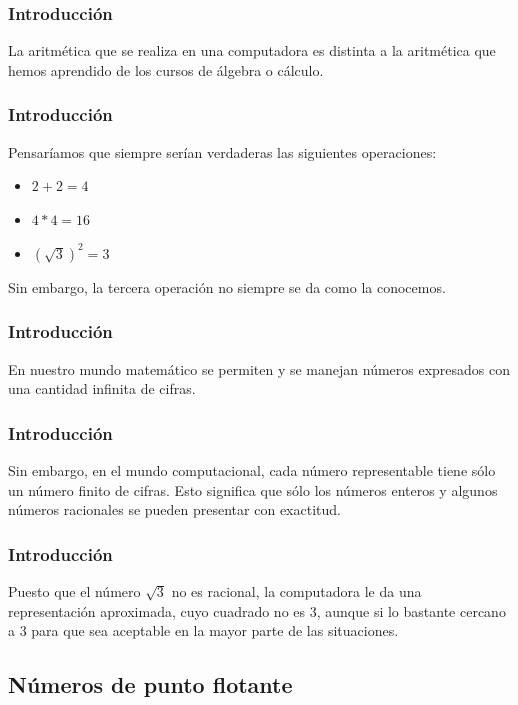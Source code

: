 \documentclass[12pt]{beamer}
\begin{document}
\begin{frame}
\frametitle{Introducción}
La aritmética que se realiza en una computadora es distinta a la aritmética que hemos aprendido de los cursos de álgebra o cálculo.
\end{frame}
\begin{frame}
\frametitle{Introducción}
Pensaríamos que siempre serían verdaderas las siguientes operaciones:
\pause
\begin{itemize}
\item[\ding{213}] $2 + 2 = 4$
\item[\ding{213}] $4 * 4 = 16$
\item[\ding{213}] $(\sqrt{3})^{2} = 3$
\end{itemize}
Sin embargo, la tercera  operación no siempre se da como la conocemos.
\end{frame}
\begin{frame}
\frametitle{Introducción}
En nuestro mundo matemático se permiten y se manejan  números expresados con una cantidad infinita de cifras.
\end{frame}
\begin{frame}
\frametitle{Introducción}
Sin embargo, en el mundo computacional, cada número representable tiene sólo un número finito de cifras. Esto significa que sólo los números enteros y algunos números racionales se pueden presentar con exactitud. 
\end{frame}
\begin{frame}
\frametitle{Introducción}
Puesto que el número $\sqrt{3}$ no es racional, la computadora le da una representación aproximada, cuyo cuadrado no es $3$, aunque si lo bastante cercano a $3$ para que sea aceptable en la mayor parte de las situaciones.
\end{frame}

\subsection{Números de punto flotante}
\end{document}
